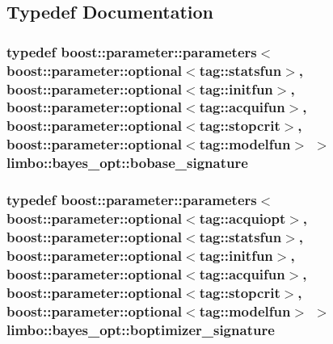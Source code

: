 \subsection{Typedef Documentation}
\hypertarget{namespacelimbo_1_1bayes__opt_a1edab117064bc665b2c743c0f3614479}{}
\subsubsection[{bobase\+\_\+signature}]{\setlength{\rightskip}{0pt plus 5cm}typedef boost\+::parameter\+::parameters$<$boost\+::parameter\+::optional$<$tag\+::statsfun$>$, boost\+::parameter\+::optional$<$tag\+::initfun$>$, boost\+::parameter\+::optional$<$tag\+::acquifun$>$, boost\+::parameter\+::optional$<$tag\+::stopcrit$>$, boost\+::parameter\+::optional$<$tag\+::modelfun$>$ $>$ {\bf limbo\+::bayes\+\_\+opt\+::bobase\+\_\+signature}}\label{namespacelimbo_1_1bayes__opt_a1edab117064bc665b2c743c0f3614479}
\hypertarget{namespacelimbo_1_1bayes__opt_aef2e9f6b642760d428c30abd9d12a61e}{}
\subsubsection[{boptimizer\+\_\+signature}]{\setlength{\rightskip}{0pt plus 5cm}typedef boost\+::parameter\+::parameters$<$boost\+::parameter\+::optional$<$tag\+::acquiopt$>$, boost\+::parameter\+::optional$<$tag\+::statsfun$>$, boost\+::parameter\+::optional$<$tag\+::initfun$>$, boost\+::parameter\+::optional$<$tag\+::acquifun$>$, boost\+::parameter\+::optional$<$tag\+::stopcrit$>$, boost\+::parameter\+::optional$<$tag\+::modelfun$>$ $>$ {\bf limbo\+::bayes\+\_\+opt\+::boptimizer\+\_\+signature}}\label{namespacelimbo_1_1bayes__opt_aef2e9f6b642760d428c30abd9d12a61e}
